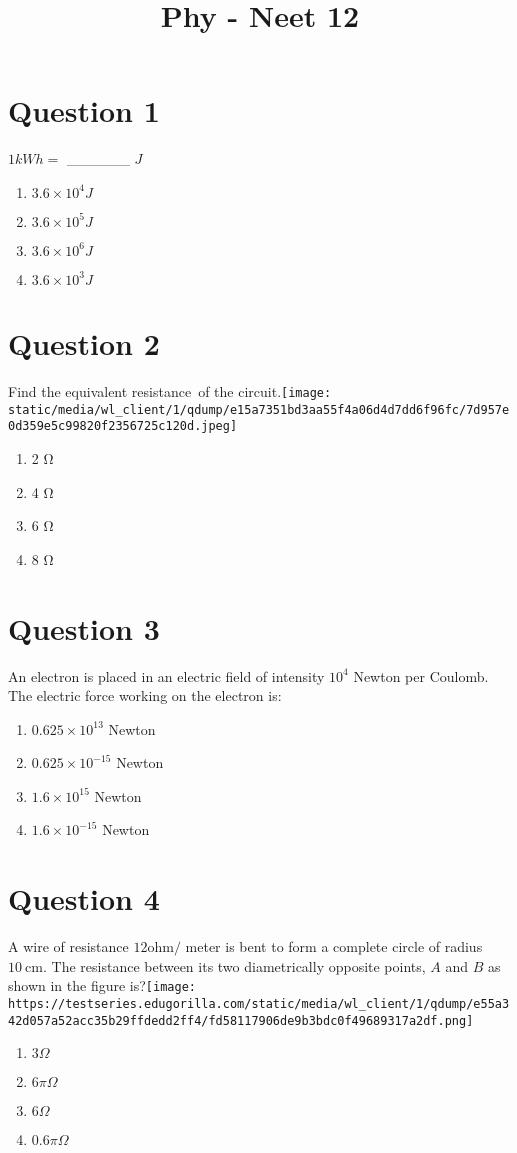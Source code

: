 \documentclass{article}
\title{Phy - Neet  12}
\begin{document}
                    \maketitle
                    \section*{Question 1}
\(1 kWh =\) ______ \(J\)
\begin{enumerate}[label=(\alph*)]
\item \(3.6 \times 10^{4} J\)
\item \(3.6 \times 10^{5} J\)
\item \(3.6 \times 10^{6} J\)
\item \(3.6 \times 10^{3} J\)
\end{enumerate}
\newpage
\section*{Question 2}
Find the equivalent resistance of the circuit.\texttt{[image: static/media/wl\_client/1/qdump/e15a7351bd3aa55f4a06d4d7dd6f96fc/7d957e0d359e5c99820f2356725c120d.jpeg]}
\begin{enumerate}[label=(\alph*)]
\item 2 Ω
\item 4 Ω
\item 6 Ω
\item 8 Ω
\end{enumerate}
\newpage
\section*{Question 3}
An electron is placed in an electric field of intensity \(10^{4}\) Newton per Coulomb. The electric force working on the electron is:
\begin{enumerate}[label=(\alph*)]
\item \(0.625 \times 10^{13}\) Newton
\item \(0.625 \times 10^{-15}\) Newton
\item \(1.6 \times 10^{15}\) Newton
\item \(1.6 \times 10^{-15}\) Newton
\end{enumerate}
\newpage
\section*{Question 4}
A wire of resistance \(12 \mathrm{ohm} /\) meter is bent to form a complete circle of radius \(10 \mathrm{~cm}\). The resistance between its two diametrically opposite points, \(A\) and \(B\) as shown in the figure is?\texttt{[image: https://testseries.edugorilla.com/static/media/wl\_client/1/qdump/e55a342d057a52acc35b29ffdedd2ff4/fd58117906de9b3bdc0f49689317a2df.png]}
\begin{enumerate}[label=(\alph*)]
\item \(3 \Omega\)
\item \(6 \pi \Omega\)
\item \(6 \Omega\)
\item \(0.6 \pi \Omega\)
\end{enumerate}
\newpage
\end{document}
